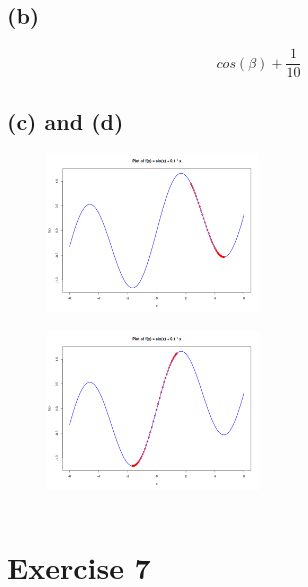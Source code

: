 \documentclass{article}
\begin{document}
\subsection*{(b)}
\[cos(\beta) + \frac{1}{10}\]
\subsection*{(c) and (d)}

\begin{figure}[h]
    \centering
    \includegraphics[width=0.5\textwidth]{figs/q6c.png}
    \caption{}
    \label{fig:q6c}
\end{figure}
\newpage

\begin{figure}[h]
    \centering
    \includegraphics[width=0.5\textwidth]{figs/q6d.png}
    \caption{}
    \label{fig:q6d}
\end{figure}
\inputminted{r}{src/q6.R}

\newpage
\section*{Exercise 7}
\end{document}
